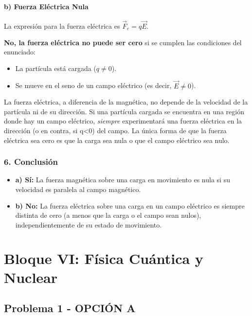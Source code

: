 \paragraph{b) Fuerza Eléctrica Nula}
La expresión para la fuerza eléctrica es $\vec{F}_e = q\vec{E}$.

\textbf{No, la fuerza eléctrica no puede ser cero} si se cumplen las condiciones del enunciado:
\begin{itemize}
    \item La partícula está cargada ($q \neq 0$).
    \item Se mueve en el seno de un campo eléctrico (es decir, $\vec{E} \neq 0$).
\end{itemize}
La fuerza eléctrica, a diferencia de la magnética, no depende de la velocidad de la partícula ni de su dirección. Si una partícula cargada se encuentra en una región donde hay un campo eléctrico, \textit{siempre} experimentará una fuerza eléctrica en la dirección (o en contra, si q<0) del campo. La única forma de que la fuerza eléctrica sea cero es que la carga sea nula o que el campo eléctrico sea nulo.

\subsubsection*{6. Conclusión}
\begin{cajaconclusion}
\begin{itemize}
    \item \textbf{a) Sí:} La fuerza magnética sobre una carga en movimiento es nula si su velocidad es paralela al campo magnético.
    \item \textbf{b) No:} La fuerza eléctrica sobre una carga en un campo eléctrico es siempre distinta de cero (a menos que la carga o el campo sean nulos), independientemente de su estado de movimiento.
\end{itemize}
\end{cajaconclusion}

\newpage

\section{Bloque VI: Física Cuántica y Nuclear}
\label{sec:cuantica_nuclear_2000_sep_ext}

\subsection{Problema 1 - OPCIÓN A}
\label{subsec:6A_2000_sep_ext}

